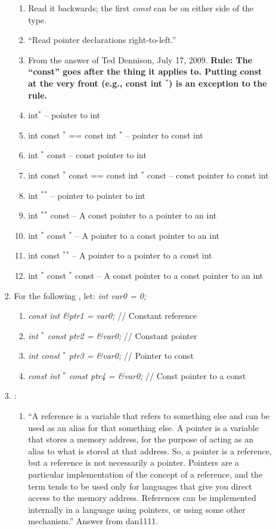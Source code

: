 \begin{enumerate}
\begin{enumerate}
\begin{enumerate}
\begin{enumerate}
			\item Read it backwards; the first {\it const} can be on either side of the type.
			\item ``Read pointer declarations right-to-left.''
			\item From the answer of Ted Dennison, July 17, 2009. {\bf Rule: The ``const'' goes after the thing it applies to. Putting const at the very front (e.g., const int $^{\ast}$) is an exception to the rule.}
			\item int$^{\ast}$ -- pointer to int
			\item int const $^{\ast}$ == const int $^{\ast}$ -- pointer to const int
			\item int $^{\ast}$ const -- const pointer to int
			\item int const $^{\ast}$ const == const int $^{\ast}$ const -- const pointer to const int
			\item int $^{\ast}$$^{\ast}$ -- pointer to pointer to int
			\item int $^{\ast}$$^{\ast}$ const -- A const pointer to a pointer to an int
			\item int $^{\ast}$ const $^{\ast}$ -- A pointer to a const pointer to an int
			\item int const $^{\ast}$$^{\ast}$ -- A pointer to a pointer to a const int
			\item int $^{\ast}$ const $^{\ast}$ const -- A const pointer to a const pointer to an int
			\end{enumerate}
		\item For the following \cite{Mortensen2015}, let: {\it int var0 = 0;} \vspace{-0.1cm}
			\begin{enumerate} \itemsep -1pt
			\item {\it const int {\rm \&}ptr1 = var0;} // Constant reference
			\item {\it int $^{\ast}$ const ptr2 = {\rm \&}var0;} // Constant pointer
			\item {\it int const $^{\ast}$ ptr3 = {\rm \&}var0;} // Pointer to const
			\item {\it const int $^{\ast}$ const ptr4 = {\rm \&}var0;} // Const pointer to a const
			\end{enumerate}
		\item \cite{Ozcan2013}: \vspace{-0.1cm}
			\begin{enumerate} \itemsep -1pt
			\item ``A reference is a variable that refers to something else and can be used as an alias for that something else. A pointer is a variable that stores a memory address, for the purpose of acting as an alias to what is stored at that address. So, a pointer is a reference, but a reference is not necessarily a pointer. Pointers are a particular implementation of the concept of a reference, and the term tends to be used only for languages that give you direct access to the memory address. References can be implemented internally in a language using pointers, or using some other mechanism.'' Answer from dan1111.

\end{enumerate}
\end{enumerate}
\end{enumerate}
\end{enumerate}
